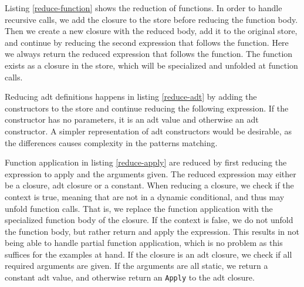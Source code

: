 

Listing \ref{reduce-function} shows the reduction of functions. In order to handle recursive calls, we add the closure to the store before reducing the function body. Then we create a new closure with the reduced body, add it to the original store, and continue by reducing the second expression that follows the function. Here we always return the reduced expression that follows the function. The function exists as a closure in the store, which will be specialized and unfolded at function calls.



Reducing \gls{adt} definitions happens in listing \ref{reduce-adt} by adding the constructors to the store and continue reducing the following expression. If the constructor has no parameters, it is an \gls{adt} value and otherwise an \gls{adt} constructor. A simpler representation of \gls{adt} constructors would be desirable, as the differences causes complexity in the patterns matching.



Function application in listing \ref{reduce-apply} are reduced by first reducing the expression to apply and the arguments given. The reduced expression may either be a closure, \gls{adt} closure or a constant. When reducing a closure, we check if the context is true, meaning that are not in a dynamic conditional, and thus may unfold function calls. That is, we replace the function application with the specialized function body of the closure. If the context is false, we do not unfold the function body, but rather return and apply the expression. This results in not being able to handle partial function application, which is no problem as this suffices for the examples at hand. If the closure is an \gls{adt} closure, we check if all required arguments are given. If the arguments are all static, we return a constant \gls{adt} value, and otherwise return an \texttt{Apply} to the \gls{adt} closure. 




